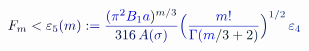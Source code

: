 \documentclass[12pt]{article}
\begin{document}
\makeatletter
\renewcommand*{\@textcolor}[3]{%
  \protect\leavevmode
  \begingroup
    \color#1{#2}#3%
  \endgroup
}
\makeatother
\begin{displaymath}
\mathcolor[RGB]{0,0,15}{F} _ { \mathcolor[RGB]{0,0,30}{m} } \mathcolor[RGB]{0,0,45}{<} \mathcolor[RGB]{0,0,60}{\varepsilon} _ { \mathcolor[RGB]{0,0,75}{5} } \mathcolor[RGB]{0,0,90}{(} \mathcolor[RGB]{0,0,105}{m} \mathcolor[RGB]{0,0,120}{)} \mathcolor[RGB]{0,0,135}{:} \mathcolor[RGB]{0,0,150}{=} \mathcolor[RGB]{0,0,165}{\frac { \mathcolor[RGB]{0,0,180}{(} \mathcolor[RGB]{0,0,195}{\pi} ^ { \mathcolor[RGB]{0,0,210}{2} } \mathcolor[RGB]{0,0,225}{B} _ { \mathcolor[RGB]{0,0,240}{1} } \mathcolor[RGB]{0,0,255}{a} \mathcolor[RGB]{0,15,0}{)} ^ { \mathcolor[RGB]{0,15,15}{m} \mathcolor[RGB]{0,15,30}{/} \mathcolor[RGB]{0,15,45}{3} } } { \mathcolor[RGB]{0,15,60}{3} \mathcolor[RGB]{0,15,75}{1} \mathcolor[RGB]{0,15,90}{6} \, \mathcolor[RGB]{0,15,105}{A} \mathcolor[RGB]{0,15,120}{(} \mathcolor[RGB]{0,15,135}{\sigma} \mathcolor[RGB]{0,15,150}{)} } } \mathcolor[RGB]{0,15,165}{\Bigl(} \mathcolor[RGB]{0,15,180}{\frac { \mathcolor[RGB]{0,15,195}{m} \mathcolor[RGB]{0,15,210}{!} } { \mathcolor[RGB]{0,15,225}{\Gamma} \mathcolor[RGB]{0,15,240}{(} \mathcolor[RGB]{0,15,255}{m} \mathcolor[RGB]{0,30,0}{/} \mathcolor[RGB]{0,30,15}{3} \mathcolor[RGB]{0,30,30}{+} \mathcolor[RGB]{0,30,45}{2} \mathcolor[RGB]{0,30,60}{)} } } \mathcolor[RGB]{0,30,75}{\Bigr)} ^ { \mathcolor[RGB]{0,30,90}{1} \mathcolor[RGB]{0,30,105}{/} \mathcolor[RGB]{0,30,120}{2} } \, \mathcolor[RGB]{0,30,135}{\varepsilon} _ { \mathcolor[RGB]{0,30,150}{4} }
\end{displaymath}
\end{document}
